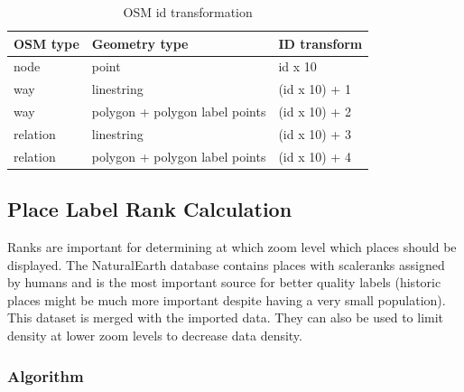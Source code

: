 \begin{table}[H]
\centering

\begin{tabular}{lll}
\hline
OSM type & Geometry type                  & \osm{} ID transform \\ \hline
node     & point                          & id x 10          \\
way      & linestring                           & (id x 10) + 1    \\
way      & polygon + polygon label points & (id x 10) + 2    \\
relation & linestring                           & (id x 10) + 3    \\
relation & polygon + polygon label points & (id x 10) + 4    \\
\end{tabular}
\caption{OSM id transformation}
\label{osm_id_transformation}
\end{table}

\subsection{Place Label Rank Calculation}\label{place_label_rank_calc}

Ranks are important for determining at which zoom level which places should be displayed. The NaturalEarth database contains places with scaleranks assigned by humans and is the most important source for better quality labels (historic places might be much more important despite having a very small population). This dataset is merged with the imported \osm{} data.
They can also be used to limit density at lower zoom levels to decrease data density.

\subsubsection*{Algorithm}

